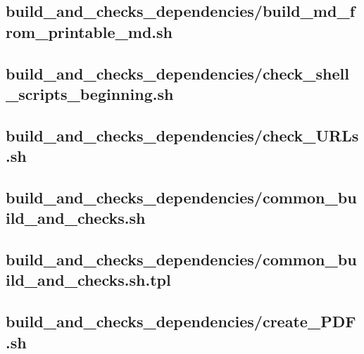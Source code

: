 \documentclass{article}
\begin{document}
\subsection{
  build\_and\_checks\_dependencies/build\_md\_from\_printable\_md.sh
}
\label{
  build_and_checks_dependencies:build_md_from_printable_mdsh
}



\subsection{
  build\_and\_checks\_dependencies/check\_shell\_scripts\_beginning.sh
}
\label{
  build_and_checks_dependencies:check_shell_scripts_beginningsh
}



\subsection{
  build\_and\_checks\_dependencies/check\_URLs.sh
}
\label{
  build_and_checks_dependencies:check_URLssh
}



\subsection{
  build\_and\_checks\_dependencies/common\_build\_and\_checks.sh
}
\label{
  build_and_checks_dependencies:common_build_and_checkssh
}



\subsection{
  build\_and\_checks\_dependencies/common\_build\_and\_checks.sh.tpl
}
\label{
  build_and_checks_dependencies:common_build_and_checksshtpl
}



\subsection{
  build\_and\_checks\_dependencies/create\_PDF.sh
}
\label{
  build_and_checks_dependencies:create_PDFsh
}
\end{document}
